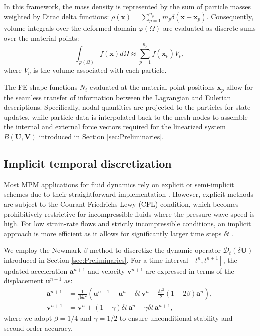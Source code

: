 \documentclass[11pt,english]{article}
\def\InitialDomain{\Omega}
\def\DeformedDomain{\varphi(\InitialDomain)}
\def\TestFunctions{\boldsymbol{V}}
\def\UnkVariables{\boldsymbol{U}}
\begin{document}
    In this framework, the mass density is represented by the sum of particle masses weighted by Dirac delta functions: $\rho(\boldsymbol{x}) = \sum_{p=1}^{n_{p}} m_{p} \delta(\boldsymbol{x} - \boldsymbol{x}_{p})$. Consequently, volume integrals over the deformed domain $\DeformedDomain$ are evaluated as discrete sums over the material points:
    \begin{equation}
        \int_{\DeformedDomain} f(\boldsymbol{x}) d\Omega \approx \sum_{p=1}^{n_{p}} f(\boldsymbol{x}_p) V_p,
    \end{equation}
    where $V_{p}$ is the volume associated with each particle. 
    
    The FE shape functions $N_i$ evaluated at the material point positions $\boldsymbol{x}_p$ allow for the seamless transfer of information between the Lagrangian and Eulerian descriptions. Specifically, nodal quantities are projected to the particles for state updates, while particle data is interpolated back to the mesh nodes to assemble the internal and external force vectors required for the linearized system $B(\UnkVariables,\TestFunctions)$ introduced in Section \ref{sec:Preliminaries}.

\subsection{Implicit temporal discretization \label{sec:temporal}} 
Most MPM applications for fluid dynamics rely on explicit or semi-implicit schemes due to their straightforward implementation \cite{mast2012mitigating, li2014sloshing}. However, explicit methods are subject to the Courant-Friedrichs-Lewy (CFL) condition, which becomes prohibitively restrictive for incompressible fluids where the pressure wave speed is high. For low strain-rate flows and strictly incompressible conditions, an implicit approach is more efficient as it allows for significantly larger time steps $\delta t$ \cite{Vaucorbeil2020material25}.

We employ the Newmark-$\beta$ method to discretize the dynamic operator $\mathcal{D}_t(\delta\UnkVariables)$ introduced in Section \ref{sec:Preliminaries}. For a time interval $[t^n, t^{n+1}]$, the updated acceleration $\boldsymbol{a}^{n+1}$ and velocity $\boldsymbol{v}^{n+1}$ are expressed in terms of the displacement $\boldsymbol{u}^{n+1}$ as:
\begin{align}
    \boldsymbol{a}^{n+1} &= \frac{1}{\beta \delta t^2} \left(\boldsymbol{u}^{n+1}-\boldsymbol{u}^n - \delta t\,\boldsymbol{v}^n - \frac{\delta t^2}{2} (1-2\beta)\boldsymbol{a}^n \right), \\
    \boldsymbol{v}^{n+1} &= \boldsymbol{v}^{n} + (1-\gamma)\delta t\, \boldsymbol{a}^n + \gamma \delta t\, \boldsymbol{a}^{n+1},
\end{align}
where we adopt $\beta = 1/4$ and $\gamma = 1/2$ to ensure unconditional stability and second-order accuracy. 
     
\end{document}

